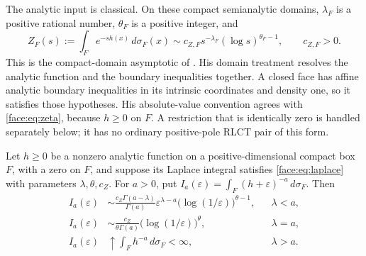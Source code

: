 The analytic input is classical.  On these compact semianalytic
domains, $\lambda_F$ is a positive rational number,
$\theta_F$ is a positive integer, and
\begin{equation}
 \label{face:eq:laplace}
 Z_F(s):=\int_F e^{-s h(x)}\,d\sigma_F(x)
 \sim c_{Z,F}s^{-\lambda_F}(\log s)^{\theta_F-1},
 \qquad c_{Z,F}>0.
\end{equation}
This is the compact-domain asymptotic of
\citet[Section~2, Theorem~2.10]{lin2017LearningCoefficient}.
His domain treatment resolves the analytic function and the boundary
inequalities together.  A closed face has affine analytic boundary
inequalities in its intrinsic coordinates and density one, so it
satisfies those hypotheses.  His absolute-value convention agrees with
\eqref{face:eq:zeta}, because $h\ge0$ on $F$.  A restriction that is
identically zero is handled separately below; it has no ordinary
positive-pole RLCT pair of this form.

\begin{lemma}
 \label{face:lem:analytic-integral}
Let $h\ge0$ be a nonzero analytic function on a positive-dimensional
compact box $F$, with a zero on $F$, and suppose its Laplace integral
satisfies \eqref{face:eq:laplace} with parameters
$\lambda,\theta,c_Z$.  For $a>0$, put
$I_a(\varepsilon)=\int_F(h+\varepsilon)^{-a}\,d\sigma_F$.  Then
\begin{align}
 I_a(\varepsilon)&\sim
 \frac{c_Z\Gamma(a-\lambda)}{\Gamma(a)}
 \varepsilon^{\lambda-a}
 \bigl(\log(1/\varepsilon)\bigr)^{\theta-1},
 &&\lambda<a, \label{face:eq:subcritical}\\
 I_a(\varepsilon)&\sim
 \frac{c_Z}{\theta\Gamma(a)}
 \bigl(\log(1/\varepsilon)\bigr)^\theta,
 &&\lambda=a, \label{face:eq:critical}\\
 I_a(\varepsilon)&\uparrow
 \int_Fh^{-a}\,d\sigma_F<\infty,
 &&\lambda>a. \label{face:eq:supercritical}
\end{align}
\end{lemma}

